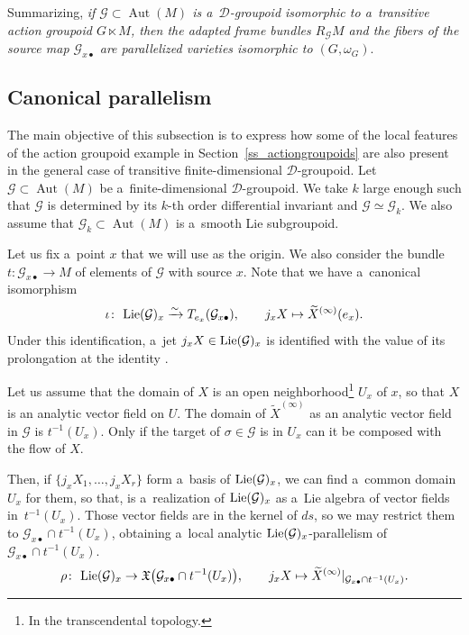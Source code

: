 \documentclass[pdftex]{sigma}
\numberwithin{equation}{section}
\theoremstyle{definition}
\begin{document}
Summarizing, \emph{if $\mathcal G\subset \operatorname{Aut}(M)$ is a~$\mathcal D$-groupoid isomorphic to a~transitive action groupoid $G\ltimes M$, then the adapted frame bundles $R_\mathcal GM$ and the fibers of the source map $\mathcal G_{x\bullet}$ are parallelized varieties isomorphic to $(G,\omega_G)$}.

\subsection{Canonical parallelism}

The main objective of this subsection is to express how some of the local features of the action groupoid example in Section~\ref{ss_actiongroupoids} are also present in the general case of transitive finite-dimensional $\mathcal D$-groupoid. Let $\mathcal G\subset\operatorname{Aut}(M)$ be a~finite-dimensional $\mathcal D$-groupoid. We take $k$ large enough such that $\mathcal G$ is determined by its $k$-th order differential invariant and $\mathcal G \simeq \mathcal G_k$. We also assume that $\mathcal G_k\subset\operatorname{Aut}(M)$ is a~smooth Lie subgroupoid.

Let us fix a~point $x$ that we will use as the origin. We also consider the bundle $t\colon \mathcal G_{x\bullet}\to M$ of elements of $\mathcal G$ with source $x$. Note that we have a~canonical isomorphism
\[\iota\colon\ {\rm Lie}(\mathcal G)_x \xrightarrow{\sim} T_{e_x}(\mathcal G_{x\bullet}), \qquad j_xX\mapsto \widetilde{X}^{(\infty)}(e_x).\]
Under this identification, a~jet $j_xX\in {\rm Lie}(\mathcal G)_x$ is identified with the value of its prolongation at the identity .

Let us assume that the domain of $X$ is an open neighborhood\footnote{In the transcendental topology.} $U_x$ of $x$, so that $X$ is an analytic vector field on $U$. The domain of $\widetilde{X}^{(\infty)}$ as an analytic vector field in $\mathcal G$ is $t^{-1}(U_x)$. Only if the target of $\sigma\in\mathcal G$ is in $U_x$ can it be composed with the flow of $X$.

Then, if $\{j_xX_1,\dots,j_xX_r\}$ form a~basis of ${\rm Lie}(\mathcal G)_x$, we can find a~common domain $U_x$ for them, so that,  is a~realization of ${\rm Lie}(\mathcal G)_x$ as a~Lie algebra of vector fields in~$t^{-1}(U_x)$. Those vector fields are in the kernel of $ds$, so we may restrict them to $\mathcal G_{x \bullet} \cap t^{-1}(U_x)$, obtaining a~local analytic ${\rm Lie}(\mathcal G)_x$-parallelism of $\mathcal G_{x\bullet} \cap t^{-1}(U_x)$.
\[\rho \colon\ {\rm Lie}(\mathcal G)_x \to \mathfrak X\bigl(\mathcal G_{x\bullet} \cap t^{-1}(U_x)\bigr),
 \qquad j_xX \mapsto \widetilde X^{(\infty)}\vert_{\mathcal G_{x\bullet} \cap t^{-1}(U_x)}.\]
\end{document}
